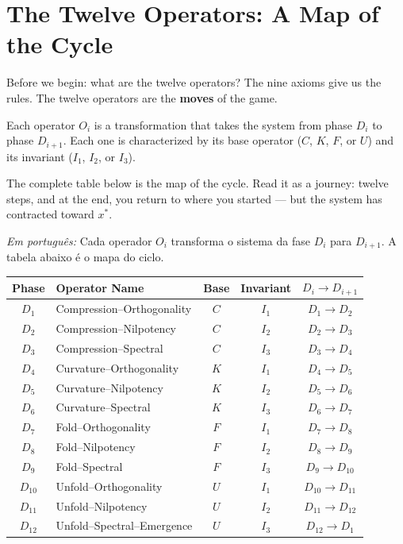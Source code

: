 \documentclass[12pt, openright]{book}
\theoremstyle{definition}
\theoremstyle{remark}
\begin{document}
\chapter{The Twelve Operators: A Map of the Cycle}
\label{ch:operators}

\begin{studentbox}{Before we begin: what are the twelve operators?}
The nine axioms give us the rules. The twelve operators are
the \textbf{moves} of the game.

Each operator $O_i$ is a transformation that takes the system
from phase $D_i$ to phase $D_{i+1}$. Each one is characterized
by its base operator ($C$, $K$, $F$, or $U$) and its invariant
($I_1$, $I_2$, or $I_3$).

The complete table below is the map of the cycle.
Read it as a journey: twelve steps, and at the end, you return
to where you started --- but the system has contracted toward $x^*$.

\textit{Em português:}
Cada operador $O_i$ transforma o sistema da fase $D_i$ para $D_{i+1}$.
A tabela abaixo é o mapa do ciclo.
\end{studentbox}

\begin{center}
{\small
\begin{tabular}{clccc}
\toprule
\textbf{Phase} & \textbf{Operator Name} & \textbf{Base} & \textbf{Invariant} & \textbf{$D_i \to D_{i+1}$}\\
\midrule
$D_1$  & Compression--Orthogonality  & $C$ & $I_1$ & $D_1 \to D_2$\\
$D_2$  & Compression--Nilpotency     & $C$ & $I_2$ & $D_2 \to D_3$\\
$D_3$  & Compression--Spectral       & $C$ & $I_3$ & $D_3 \to D_4$\\
$D_4$  & Curvature--Orthogonality    & $K$ & $I_1$ & $D_4 \to D_5$\\
$D_5$  & Curvature--Nilpotency       & $K$ & $I_2$ & $D_5 \to D_6$\\
$D_6$  & Curvature--Spectral         & $K$ & $I_3$ & $D_6 \to D_7$\\
$D_7$  & Fold--Orthogonality         & $F$ & $I_1$ & $D_7 \to D_8$\\
$D_8$  & Fold--Nilpotency            & $F$ & $I_2$ & $D_8 \to D_9$\\
$D_9$  & Fold--Spectral              & $F$ & $I_3$ & $D_9 \to D_{10}$\\
$D_{10}$ & Unfold--Orthogonality     & $U$ & $I_1$ & $D_{10} \to D_{11}$\\
$D_{11}$ & Unfold--Nilpotency        & $U$ & $I_2$ & $D_{11} \to D_{12}$\\
$D_{12}$ & Unfold--Spectral--Emergence & $U$ & $I_3$ & $D_{12} \to D_1$\\
\bottomrule
\end{tabular}
}
\end{center}
\end{document}
